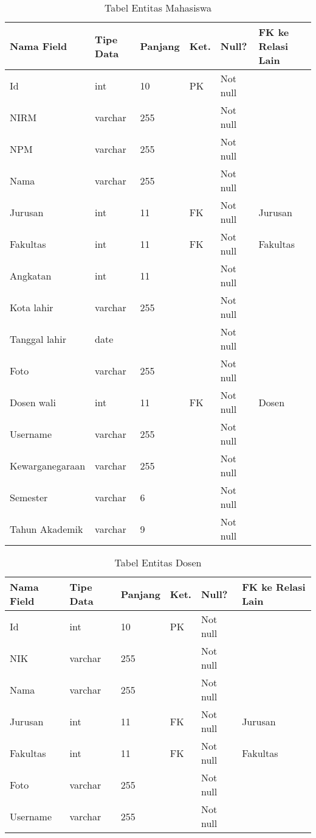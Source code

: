 \begin{table}[H]
\centering
\caption{Tabel Entitas Mahasiswa}
\label{entitas_mahasiswa}
\begin{tabular}{|l|l|l|l|l|l|}
\hline
\textbf{Nama Field}&\textbf{Tipe Data}&\textbf{Panjang}&\textbf{Ket.}&\textbf{Null?}&\textbf{FK ke Relasi Lain}\\ \hline
Id&int&10&PK&Not null&\\ \hline
NIRM&varchar&255&&Not null&\\ \hline
NPM&varchar&255&&Not null&\\ \hline
Nama&varchar&255&&Not null&\\ \hline
Jurusan&int&11&FK&Not null&Jurusan\\ \hline
Fakultas&int&11&FK&Not null&Fakultas\\ \hline
Angkatan&int&11&&Not null&\\ \hline
Kota lahir&varchar&255&&Not null&\\ \hline
Tanggal lahir&date&&&Not null&\\ \hline
Foto&varchar&255&&Not null&\\ \hline
Dosen wali&int&11&FK&Not null&Dosen\\ \hline
Username&varchar&255&&Not null&\\ \hline
Kewarganegaraan&varchar&255&&Not null&\\ \hline
Semester&varchar&6&&Not null&\\ \hline
Tahun Akademik&varchar&9&&Not null&\\ \hline
\end{tabular}
\end{table}

\begin{table}[H]
\centering
\caption{Tabel Entitas Dosen}
\label{entitas_dosen}
\begin{tabular}{|l|l|l|l|l|l|}
\hline
\textbf{Nama Field}&\textbf{Tipe Data}&\textbf{Panjang}&\textbf{Ket.}&\textbf{Null?}&\textbf{FK ke Relasi Lain}\\ \hline
Id&int&10&PK&Not null&\\ \hline
NIK&varchar&255&&Not null&\\ \hline
Nama&varchar&255&&Not null&\\ \hline
Jurusan&int&11&FK&Not null&Jurusan\\ \hline
Fakultas&int&11&FK&Not null&Fakultas\\ \hline
Foto&varchar&255&&Not null&\\ \hline
Username&varchar&255&&Not null&\\ \hline
\end{tabular}
\end{table}

